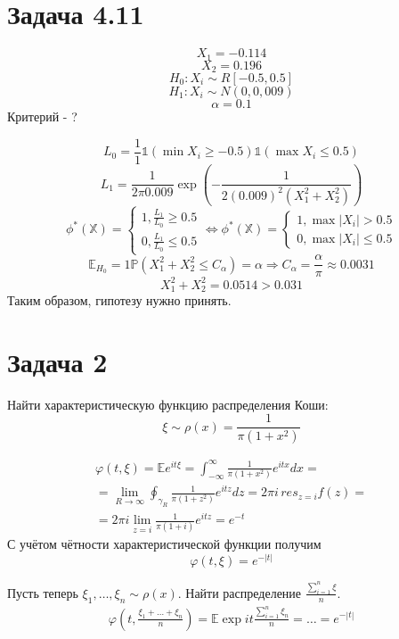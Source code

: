 \documentclass[11pt]{article}
\author{Sergey Makarov}
\date{\today}
\title{}
\begin{document}
\section{Задача 4.11}
\label{sec:org32f4507}
$$X_1 = -0.114$$
$$X_2 = 0.196$$
$$H_0: X_i \sim R[-0.5, 0.5]$$
$$H_1: X_i \sim N(0, 0,009)$$
$$\alpha = 0.1$$
Критерий - ?

$$L_0 = \frac{1}1\mathbb{1}(\min X_i \geq -0.5)\mathbb{1}(\max X_i \leq 0.5)$$
$$L_1 = \frac{1}{2\pi 0.009}\exp\left(-\frac{1}{2(0.009)^2(X_1^2+X_2^2)}\right)$$
\begin{equation*}
\phi^*(\mathbb{X}) = \begin{cases}
1, \frac{L_1}{L_0} \geq 0.5\\
0, \frac{L_1}{L_0} \leq 0.5
\end{cases} \Leftrightarrow \phi^*(\mathbb{X}) = \begin{cases}
1, \max |X_i| > 0.5\\
0, \max |X_i| \leq 0.5
\end{cases}
\end{equation*}
$$\mathbb{E}_{H_0} = 1\mathbb{P}{(X_1^2 + X_2^2 \leq C_\alpha)} = \alpha
\Rightarrow C_\alpha = \frac{\alpha}{\pi} \approx 0.0031$$
$$X_1^2 + X_2^2 = 0.0514 > 0.031$$
Таким образом, гипотезу нужно принять.
\section{Задача 2}
\label{sec:org5904462}
Найти характеристическую функцию распределения Коши:
$$\xi \sim \rho(x) = \frac{1}{\pi(1 + x^2)}$$

\begin{multline*}
\varphi(t, \xi) = \mathbb{E}e^{it\xi} = \int_{-\infty}^\infty\frac{1}{\pi(1+x^2)}e^{itx}dx = \\
 = \lim_{R \to \infty}\oint_{\gamma_R}\frac{1}{\pi(1+z^2)}e^{itz}dz = 2\pi i\, res_{z=i} f(z) = \\
 = 2\pi i \lim_{z=i}\frac{1}{\pi(1+i)}e^{itz} = e^{-t}
\end{multline*}
С учётом чётности характеристической функции получим $$\varphi(t, \xi) = e^{-|t|}$$

Пусть теперь \(\xi_1, \ldots, \xi_n \sim \rho(x)\). Найти распределение \(\frac{\sum_{i = 1}^n\xi}{n}\).
\begin{multline*}
\varphi(t, \frac{\xi_1 + \ldots + \xi_n}{n}) = \mathbb{E}\exp{it\frac{\sum_{i = 1}^n\xi_n}{n}} = \ldots = e^{-|t|}
\end{multline*}
\end{document}
